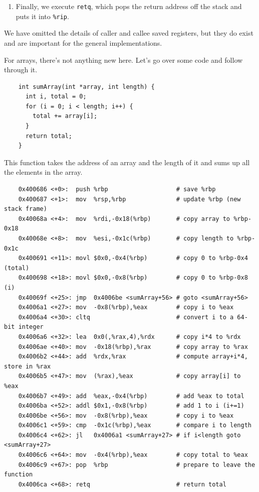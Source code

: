 \documentclass{article}
\begin{document}
\begin{example}
\begin{enumerate}
      \item Finally, we execute \texttt{retq}, which pops the return address off the stack and puts it into \texttt{\%rip}. 
    \end{enumerate}
  \end{example}

  We have omitted the details of caller and callee saved registers, but they do exist and are important for the general implementations. 

  For arrays, there's not anything new here. Let's go over some code and follow through it. 

  \begin{lstlisting}
    int sumArray(int *array, int length) {
      int i, total = 0;
      for (i = 0; i < length; i++) {
        total += array[i];
      }
      return total;
    }
  \end{lstlisting}

  This function takes the address of an array and the length of it and sums up all the elements in the array. 

  \begin{lstlisting}
    0x400686 <+0>:	push %rbp                   # save %rbp
    0x400687 <+1>:	mov  %rsp,%rbp              # update %rbp (new stack frame)
    0x40068a <+4>:	mov  %rdi,-0x18(%rbp)       # copy array to %rbp-0x18
    0x40068e <+8>:	mov  %esi,-0x1c(%rbp)       # copy length to %rbp-0x1c
    0x400691 <+11>:	movl $0x0,-0x4(%rbp)        # copy 0 to %rbp-0x4 (total)
    0x400698 <+18>:	movl $0x0,-0x8(%rbp)        # copy 0 to %rbp-0x8 (i)
    0x40069f <+25>:	jmp  0x4006be <sumArray+56> # goto <sumArray+56>
    0x4006a1 <+27>:	mov  -0x8(%rbp),%eax        # copy i to %eax
    0x4006a4 <+30>:	cltq                        # convert i to a 64-bit integer
    0x4006a6 <+32>:	lea  0x0(,%rax,4),%rdx      # copy i*4 to %rdx
    0x4006ae <+40>:	mov  -0x18(%rbp),%rax       # copy array to %rax
    0x4006b2 <+44>:	add  %rdx,%rax              # compute array+i*4, store in %rax
    0x4006b5 <+47>:	mov  (%rax),%eax            # copy array[i] to %eax
    0x4006b7 <+49>:	add  %eax,-0x4(%rbp)        # add %eax to total
    0x4006ba <+52>:	addl $0x1,-0x8(%rbp)        # add 1 to i (i+=1)
    0x4006be <+56>:	mov  -0x8(%rbp),%eax        # copy i to %eax
    0x4006c1 <+59>:	cmp  -0x1c(%rbp),%eax       # compare i to length
    0x4006c4 <+62>:	jl   0x4006a1 <sumArray+27> # if i<length goto <sumArray+27>
    0x4006c6 <+64>:	mov  -0x4(%rbp),%eax        # copy total to %eax
    0x4006c9 <+67>:	pop  %rbp                   # prepare to leave the function
    0x4006ca <+68>:	retq                        # return total
  \end{lstlisting}
\end{document}
